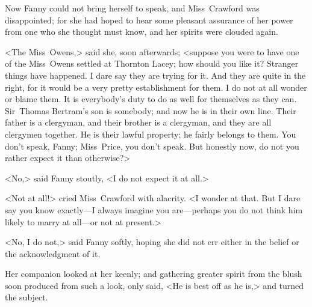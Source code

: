 Now Fanny could not bring herself to speak, and Miss~Crawford was disappointed; for she had hoped to hear some pleasant assurance of her power from one who she thought must know, and her spirits were clouded again.

<The Miss~Owens,> said she, soon afterwards; <suppose you were to have one of the Miss~Owens settled at Thornton Lacey; how should you like it? Stranger things have happened. I dare say they are trying for it. And they are quite in the right, for it would be a very pretty establishment for them. I do not at all wonder or blame them. It is everybody's duty to do as well for themselves as they can. Sir~Thomas Bertram's son is somebody; and now he is in their own line. Their father is a clergyman, and their brother is a clergyman, and they are all clergymen together. He is their lawful property; he fairly belongs to them. You don't speak, Fanny; Miss~Price, you don't speak. But honestly now, do not you rather expect it than otherwise?>

<No,> said Fanny stoutly, <I do not expect it at all.>

<Not at all!> cried Miss~Crawford with alacrity. <I wonder at that. But I dare say you know exactly—I always imagine you are—perhaps you do not think him likely to marry at all—or not at present.>

<No, I do not,> said Fanny softly, hoping she did not err either in the belief or the acknowledgment of it.

Her companion looked at her keenly; and gathering greater spirit from the blush soon produced from such a look, only said, <He is best off as he is,> and turned the subject. 